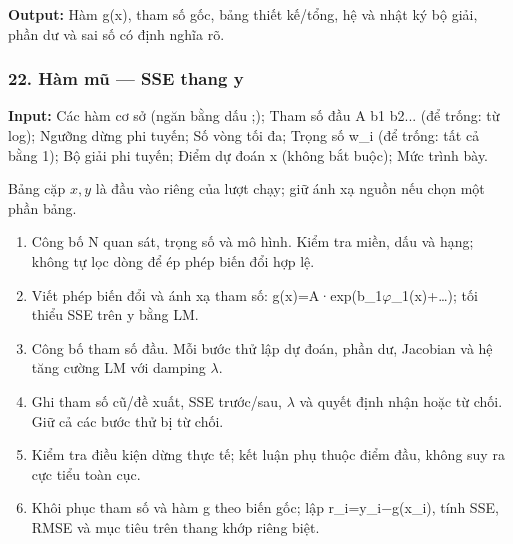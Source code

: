 \textbf{Output:} Hàm g(\allowbreak{}x),\allowbreak{} tham số gốc,\allowbreak{} bảng thiết kế/\allowbreak{}tổng,\allowbreak{} hệ và nhật ký bộ giải,\allowbreak{} phần dư và sai số có định nghĩa rõ.

\examplebreak\subsubsection*{22. Hàm mũ — SSE thang y}

\textbf{Input:} Các hàm cơ sở (\allowbreak{}ngăn bằng dấu ;\allowbreak{});\allowbreak{} Tham số đầu A b1 b2... (\allowbreak{}để trống: từ log);\allowbreak{} Ngưỡng dừng phi tuyến;\allowbreak{} Số vòng tối đa;\allowbreak{} Trọng số w\_i (\allowbreak{}để trống: tất cả bằng 1);\allowbreak{} Bộ giải phi tuyến;\allowbreak{} Điểm dự đoán x (\allowbreak{}không bắt buộc);\allowbreak{} Mức trình bày.

Bảng cặp $x,y$ là đầu vào riêng của lượt chạy; giữ ánh xạ nguồn nếu chọn một phần bảng.

\begin{enumerate}

\item Công bố N quan sát,\allowbreak{} trọng số và mô hình. Kiểm tra miền,\allowbreak{} dấu và hạng;\allowbreak{} không tự lọc dòng để ép phép biến đổi hợp lệ.

\item Viết phép biến đổi và ánh xạ tham số: g(\allowbreak{}x)=\allowbreak{}A·exp(\allowbreak{}b\_1\ensuremath{\varphi}\_1(\allowbreak{}x)+\allowbreak{}…);\allowbreak{} tối thiểu SSE trên y bằng LM.

\item Công bố tham số đầu. Mỗi bước thử lập dự đoán,\allowbreak{} phần dư,\allowbreak{} Jacobian và hệ tăng cường LM với damping \ensuremath{\lambda}.

\item Ghi tham số cũ/\allowbreak{}đề xuất,\allowbreak{} SSE trước/\allowbreak{}sau,\allowbreak{} \ensuremath{\lambda} và quyết định nhận hoặc từ chối. Giữ cả các bước thử bị từ chối.

\item Kiểm tra điều kiện dừng thực tế;\allowbreak{} kết luận phụ thuộc điểm đầu,\allowbreak{} không suy ra cực tiểu toàn cục.

\item Khôi phục tham số và hàm g theo biến gốc;\allowbreak{} lập r\_i=\allowbreak{}y\_i\ensuremath{-}g(\allowbreak{}x\_i),\allowbreak{} tính SSE,\allowbreak{} RMSE và mục tiêu trên thang khớp riêng biệt.

\end{enumerate}

